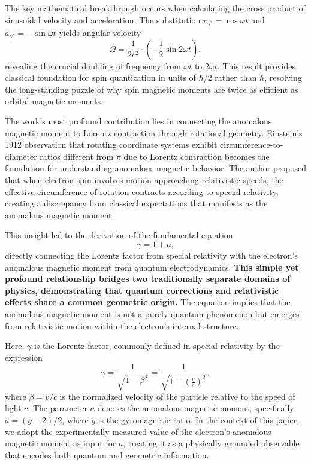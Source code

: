 \documentclass[%
 reprint,
 amsmath,amssymb,
 aps,
]{revtex4-1}
\numberwithin{equation}{section}%
\begin{document}
The key mathematical breakthrough occurs when calculating the cross product of sinusoidal velocity and acceleration. The substitution $v_{\gamma^*} = \cos\omega t$ and $a_{\gamma^*} = -\sin\omega t$ yields angular velocity
\begin{equation}
\Omega = \frac{1}{2c^2} \cdot \left( -\frac{1}{2}\sin 2\omega t \right),
\end{equation}
revealing the crucial doubling of frequency from $\omega t$ to $2\omega t$. This result provides classical foundation for spin quantization in units of $\hbar/2$ rather than $\hbar$, resolving the long-standing puzzle of why spin magnetic moments are twice as efficient as orbital magnetic moments.

The work's most profound contribution lies in connecting the anomalous magnetic moment to Lorentz contraction through rotational geometry. Einstein's 1912 observation that rotating coordinate systems exhibit circumference-to-diameter ratios different from $\pi$ due to Lorentz contraction becomes the foundation for understanding anomalous magnetic behavior. The author proposed that when electron spin involves motion approaching relativistic speeds, the effective circumference of rotation contracts according to special relativity, creating a discrepancy from classical expectations that manifests as the anomalous magnetic moment.

This insight led to the derivation of the fundamental equation
\begin{equation}
\gamma = 1 + a,
\label{eq:gamma_anomaly_relation}
\end{equation}
directly connecting the Lorentz factor from special relativity with the electron's anomalous magnetic moment from quantum electrodynamics. \textbf{This simple yet profound relationship bridges two traditionally separate domains of physics, demonstrating that quantum corrections and relativistic effects share a common geometric origin.} The equation implies that the anomalous magnetic moment is not a purely quantum phenomenon but emerges from relativistic motion within the electron's internal structure.

Here, \( \gamma \) is the Lorentz factor, commonly defined in special relativity by the expression
\begin{equation}
\gamma = \frac{1}{\sqrt{1 - \beta^2}} = \frac{1}{\sqrt{1 - \left( \frac{v}{c} \right)^2}},
\label{eq:lorentz_factor_definition}
\end{equation}
where \( \beta = v/c \) is the normalized velocity of the particle relative to the speed of light \( c \). The parameter \( a \) denotes the anomalous magnetic moment, specifically \( a = (g - 2)/2 \), where \( g \) is the gyromagnetic ratio. In the context of this paper, we adopt the experimentally measured value of the electron's anomalous magnetic moment as input for \( a \), treating it as a physically grounded observable that encodes both quantum and geometric information.
\end{document}
